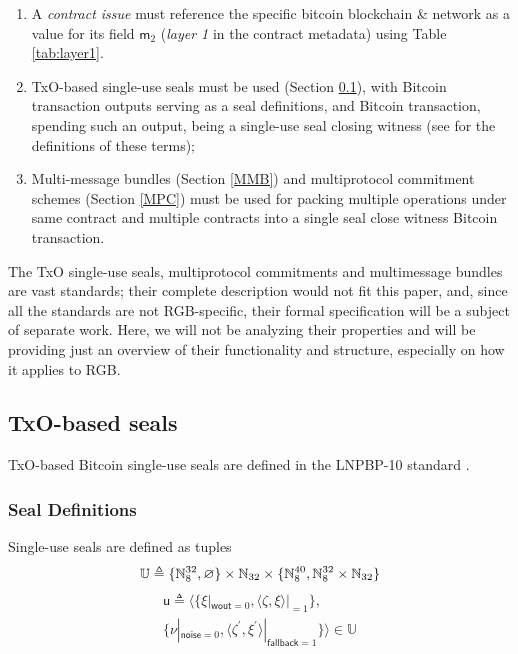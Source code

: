 \documentclass[9pt,oneside]{amsart}
\begin{document}
\begin{multicols}{2}
\begin{enumerate}
\item A \emph{contract issue} must reference the specific bitcoin blockchain \& network
  as a value for its field $\mathsf{m}_2$ (\emph{layer 1} in the contract metadata)
  using Table \ref{tab:layer1}.
\item TxO-based single-use seals must be used (Section \ref{Seals}),
  with Bitcoin transaction outputs serving as a seal definitions,
  and Bitcoin transaction, spending such an output, being a single-use seal closing witness
  (see \cite{LNPBP8} for the definitions of these terms);
\item Multi-message bundles (Section \ref{MMB})
  and multiprotocol commitment schemes (Section \ref{MPC}) must be used for packing
  multiple operations under same contract and multiple contracts
  into a single \gls{seal close witness} Bitcoin transaction.
\end{enumerate}

The TxO single-use seals, multiprotocol commitments and multimessage bundles are vast standards;
their complete description would not fit this paper, and,
since all the standards are not RGB-specific,
their formal specification will be a subject of separate work.
Here, we will not be analyzing their properties and will be providing just an overview
of their functionality and structure, especially on how it applies to RGB.

\subsection{TxO-based seals}\label{Seals}

TxO-based Bitcoin single-use seals are defined in the LNPBP-10 standard \cite{LNPBP10}.

\subsubsection{Seal Definitions}

Single-use seals are defined as tuples
\noindent
\begin{equation}
    \mathbb{U} \triangleq \{ \mathbb{N}_8^{32}, \varnothing \} \times \mathbb{N}_{32} \times \{ \mathbb{N}_8^{40}, \mathbb{N}_8^{32} \times \mathbb{N}_{32} \} \\
\end{equation}
\begin{multline}
    \mathsf{u} \triangleq \big\langle \{\xi|_{\mathsf{wout}=0}, \langle \zeta, \xi\rangle|_{=1} \}, \\
        \{\nu|_{\mathsf{noise}=0}, \langle \zeta^\prime, \xi^\prime\rangle|_{\mathsf{fallback}=1} \} \big\rangle \in \mathbb{U}
\end{multline}


\end{multicols}
\end{document}
